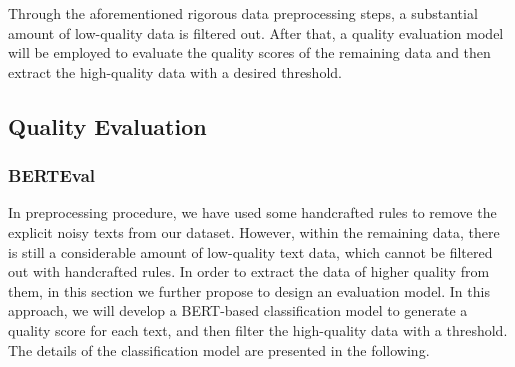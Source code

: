 \documentclass{article}
\begin{document}



Through the aforementioned rigorous data preprocessing steps, a substantial amount of low-quality data is filtered out. After that, a quality evaluation model will be employed to evaluate the quality scores of the remaining data and then extract the high-quality data with a desired threshold. 

\subsection{Quality Evaluation}
\label{quality_evaluation}
\subsubsection{BERTEval}

In preprocessing procedure, we have used some handcrafted rules to remove the explicit noisy texts from our dataset. However, within the remaining data, there is still a considerable amount of low-quality text data, which cannot be filtered out with handcrafted rules. In order to extract the data of higher quality from them, in this section we further propose to design an evaluation model. In this approach, we will develop a BERT-based classification model to generate a quality score for each text, and then filter the high-quality data with a threshold. The details of the classification model are presented in the following.

\end{document}
